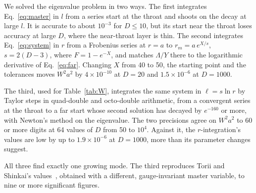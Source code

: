 \documentclass[11pt]{article}
\theoremstyle{remark}
\begin{document}
We solved the eigenvalue problem in two ways. The first integrates Eq.~\eqref{eq:master} in $l$ from a series start
at the throat and shoots on the decay at large $l$. It is accurate to about $10^{-3}$ for $D\le10$, but its start near
the throat loses accuracy at large $D$, where the near-throat layer is thin. The second integrates
Eq.~\eqref{eq:system} in $r$ from a Frobenius series at $r=a$ to $r_m=a\,e^{X/s}$, $s=2(D-3)$, where $F=1-e^{-X}$, and
matches $\Lambda/Y$ there to the logarithmic derivative of Eq.~\eqref{eq:far}. Changing $X$ from 40 to 50, the
starting point and the tolerances moves $W^2a^2$ by $4\times10^{-10}$ at $D=20$ and $1.5\times10^{-6}$ at $D=1000$.

The third, used for Table~\ref{tab:W}, integrates the same system in $\ell=s\ln r$ by Taylor steps in quad-double and
octo-double arithmetic, from a convergent series at the throat to a far start whose second solution has decayed by
$e^{-160}$ or more, with Newton's method on the eigenvalue. The two precisions agree on $W^2a^2$ to 60 or more digits at
64 values of $D$ from 50 to $10^4$. Against it, the $r$-integration's values are low by up to
$1.9\times10^{-6}$ at $D=1000$, more than its parameter changes suggest.

All three find exactly one growing mode. The third reproduces Torii and Shinkai's values~\cite{TS2013}, obtained with a
different, gauge-invariant master variable, to nine or more significant figures.
\end{document}

